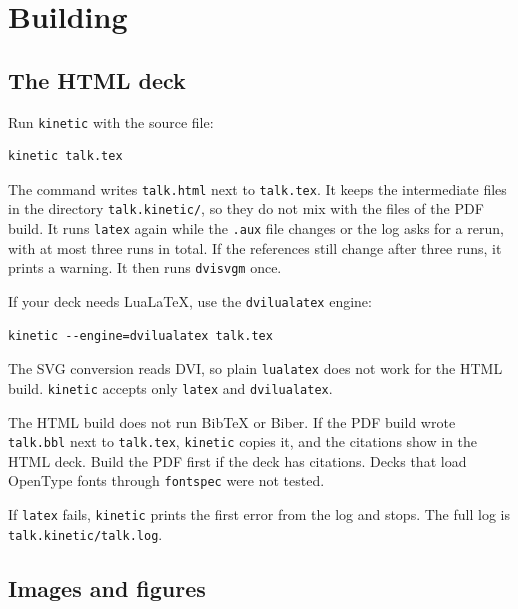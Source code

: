 \documentclass[11pt]{article}
\newcommand{\cmd}[1]{\texttt{#1}}
\begin{document}
\section{Building}

\subsection{The HTML deck}

Run \cmd{kinetic} with the source file:
\begin{lstlisting}
kinetic talk.tex
\end{lstlisting}
The command writes \cmd{talk.html} next to \cmd{talk.tex}. It keeps the
intermediate files in the directory \cmd{talk.kinetic/}, so they do not mix with
the files of the PDF build. It runs \cmd{latex} again while the \cmd{.aux} file
changes or the log asks for a rerun, with at most three runs in total. If the
references still change after three runs, it prints a warning. It then runs
\cmd{dvisvgm} once.

If your deck needs LuaLaTeX, use the \cmd{dvilualatex} engine:
\begin{lstlisting}
kinetic --engine=dvilualatex talk.tex
\end{lstlisting}
The SVG conversion reads DVI, so plain \cmd{lualatex} does not work for the HTML
build. \cmd{kinetic} accepts only \cmd{latex} and \cmd{dvilualatex}.

The HTML build does not run BibTeX or Biber. If the PDF build wrote
\cmd{talk.bbl} next to \cmd{talk.tex}, \cmd{kinetic} copies it, and the
citations show in the HTML deck. Build the PDF first if the deck has citations. Decks that load OpenType fonts through \cmd{fontspec} were not tested.

If \cmd{latex} fails, \cmd{kinetic} prints the first error from the log and stops.
The full log is \cmd{talk.kinetic/talk.log}.

\subsection{Images and figures}
\end{document}
